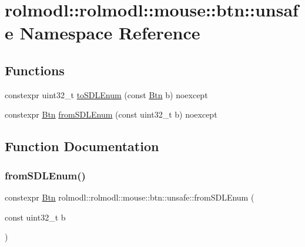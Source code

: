 \hypertarget{namespacerolmodl_1_1rolmodl_1_1mouse_1_1btn_1_1unsafe}{}\section{rolmodl\+::rolmodl\+::mouse\+::btn\+::unsafe Namespace Reference}
\label{namespacerolmodl_1_1rolmodl_1_1mouse_1_1btn_1_1unsafe}
\subsection*{Functions}
\begin{DoxyCompactItemize}
\item 
constexpr uint32\+\_\+t \mbox{\hyperlink{namespacerolmodl_1_1rolmodl_1_1mouse_1_1btn_1_1unsafe_a76b354074768617e9cdcb51508820b8d}{to\+S\+D\+L\+Enum}} (const \mbox{\hyperlink{namespacerolmodl_1_1rolmodl_1_1mouse_a5ed523191c7ec81f6e69f02b9a616ebf}{Btn}} b) noexcept
\item 
constexpr \mbox{\hyperlink{namespacerolmodl_1_1rolmodl_1_1mouse_a5ed523191c7ec81f6e69f02b9a616ebf}{Btn}} \mbox{\hyperlink{namespacerolmodl_1_1rolmodl_1_1mouse_1_1btn_1_1unsafe_a6c5cb72c107b24bf7190a4f1134ebc60}{from\+S\+D\+L\+Enum}} (const uint32\+\_\+t b) noexcept
\end{DoxyCompactItemize}


\subsection{Function Documentation}
\mbox{\label{namespacerolmodl_1_1rolmodl_1_1mouse_1_1btn_1_1unsafe_a6c5cb72c107b24bf7190a4f1134ebc60}} 
\subsubsection{\texorpdfstring{fromSDLEnum()}{fromSDLEnum()}}
{\footnotesize\ttfamily constexpr \mbox{\hyperlink{namespacerolmodl_1_1rolmodl_1_1mouse_a5ed523191c7ec81f6e69f02b9a616ebf}{Btn}} rolmodl\+::rolmodl\+::mouse\+::btn\+::unsafe\+::from\+S\+D\+L\+Enum (\begin{DoxyParamCaption}\item[{const uint32\+\_\+t}]{b }\end{DoxyParamCaption})\hspace{0.3cm}{\ttfamily [noexcept]}}



